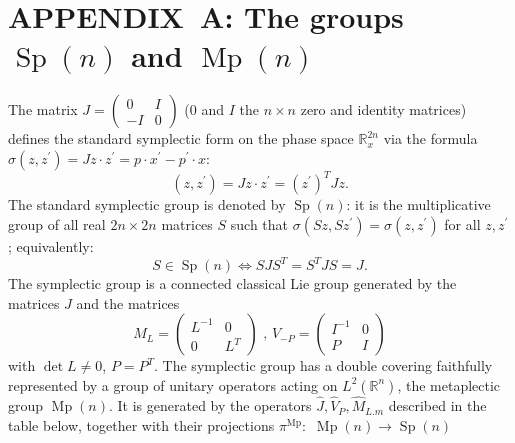 \documentclass[11pt]{article}%
\begin{document}
\section*{APPENDIX\ A: The groups $\operatorname*{Sp}(n)$ and
$\operatorname*{Mp}(n)$}

The matrix $J=%
\begin{pmatrix}
0 & I\\
-I & 0
\end{pmatrix}
$ ($0$ and $I$ the $n\times n$ zero and identity matrices) defines the
standard symplectic form on the phase space $\mathbb{R}_{x}^{2n}$ via the
formula $\sigma(z,z^{\prime})=Jz\cdot z^{\prime}=p\cdot x^{\prime}-p^{\prime
}\cdot x$:%
\[
(z,z^{\prime})=Jz\cdot z^{\prime}=(z^{\prime})^{T}Jz.
\]
The standard symplectic group is denoted by $\operatorname*{Sp}(n)$: it is the
multiplicative group of all real $2n\times2n$ matrices $S$ such that
$\sigma(Sz,Sz^{\prime})=\sigma(z,z^{\prime})$ for all $z,z^{\prime}$;
equivalently:%
\[
S\in\operatorname*{Sp}(n)\Longleftrightarrow SJS^{T}=S^{T}JS=J.
\]
The symplectic group is a connected classical Lie group generated by the
matrices $J$ and the matrices%
\[
M_{L}=%
\begin{pmatrix}
L^{-1} & 0\\
0 & L^{T}%
\end{pmatrix}
\text{ \ , \ }V_{-P}=%
\begin{pmatrix}
I^{-1} & 0\\
P & I
\end{pmatrix}
\]
with $\det L\neq0$, $P=P^{T}$. The symplectic group has a double covering
faithfully represented by a group of unitary operators acting on
$L^{2}(\mathbb{R}^{n})$, the metaplectic group $\operatorname*{Mp}(n).$ It is
generated by the operators $\widehat{J},\widehat{V}_{P},\widehat{M}_{L.m}$
described in the table below, together with their projections $\pi
^{\operatorname*{Mp}}:$ $\operatorname*{Mp}(n)\longrightarrow
\operatorname*{Sp}(n)$
\end{document}
